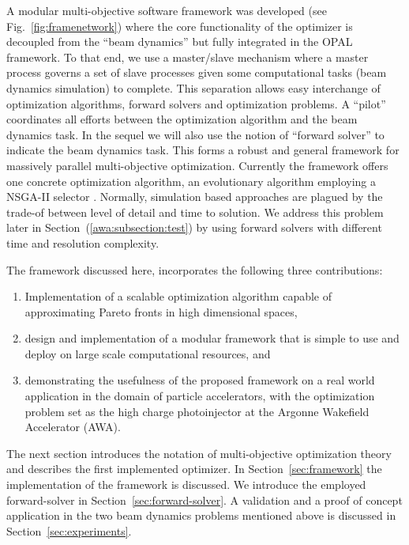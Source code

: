 \documentclass[%
reprint,
amsmath,amssymb,
aps,
prstab,
]{revtex4-1}
\begin{document}
A modular multi-objective software framework was developed (see
 Fig.~\ref{fig:framenetwork}) where the core functionality of the optimizer is decoupled from
 the ``beam dynamics'' but fully integrated in the OPAL \cite{opal} framework. 
To that end, we use a master/slave mechanism where a master process governs a
 set of slave processes given some computational tasks (beam dynamics simulation) to complete.
This separation allows easy interchange of optimization algorithms, forward
  solvers and optimization problems.
A ``pilot'' coordinates all efforts between the optimization algorithm and the
  beam dynamics task. In the sequel we will also use the notion of ``forward solver'' to indicate 
  the beam dynamics task.
This forms a robust and general framework for massively parallel
  multi-objective optimization.
Currently the framework offers one concrete optimization algorithm, an
  evolutionary algorithm employing a \textsc{NSGA-II} selector \cite{pisa}.
Normally, simulation based approaches are plagued by the trade-of between
  level of detail and time to solution.
We address this problem later in Section~(\ref{awa:subsection:test}) by using forward solvers with different time and
  resolution complexity.

The framework discussed here, incorporates the following three contributions:
%
\begin{enumerate}
  \item Implementation of a scalable optimization algorithm capable of
        approximating Pareto fronts in high dimensional spaces,
  \item design and implementation of a modular framework that is simple to use
        and deploy on large scale computational resources, and
  \item demonstrating the usefulness of the proposed framework on a real world
        application in the domain of particle accelerators,
        with the optimization problem set as 
        the high charge photoinjector at the Argonne Wakefield Accelerator (AWA). 
\end{enumerate}

The next section introduces the notation of multi-objective optimization
theory and describes the first implemented optimizer.
In Section~\ref{sec:framework} the implementation of the framework is discussed.
We introduce the employed forward-solver in Section~\ref{sec:forward-solver}.
A validation and a proof of concept application in the two beam dynamics problems 
mentioned above is discussed in Section~\ref{sec:experiments}.
\end{document}
